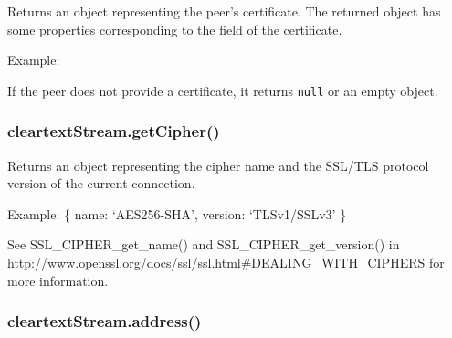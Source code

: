 Returns an object representing the peer's certificate. The returned
object has some properties corresponding to the field of the
certificate.

Example:

\begin{Shaded}
\begin{Highlighting}[]
\NormalTok{\{ }\NormalTok{: }
   \NormalTok{\{ }\NormalTok{: }\NormalTok{,}
     \NormalTok{: }\NormalTok{,}
     \NormalTok{: }\NormalTok{,}
     \NormalTok{: }\NormalTok{,}
     \NormalTok{: }\NormalTok{,}
     \NormalTok{: } \NormalTok{\},}
  \NormalTok{: }
   \NormalTok{\{ }\NormalTok{: }\NormalTok{,}
     \NormalTok{: }\NormalTok{,}
     \NormalTok{: }\NormalTok{,}
     \NormalTok{: }\NormalTok{,}
     \NormalTok{: }\NormalTok{,}
     \NormalTok{: } \NormalTok{\},}
  \NormalTok{: }\NormalTok{,}
  \NormalTok{: }\NormalTok{,}
  \NormalTok{: } \NormalTok{\}}
\end{Highlighting}
\end{Shaded}

If the peer does not provide a certificate, it returns \texttt{null} or
an empty object.

\subsubsection{cleartextStream.getCipher()}

Returns an object representing the cipher name and the SSL/TLS protocol
version of the current connection.

Example: \{ name: `AES256-SHA', version: `TLSv1/SSLv3' \}

See SSL\_CIPHER\_get\_name() and SSL\_CIPHER\_get\_version() in
http://www.openssl.org/docs/ssl/ssl.html\#DEALING\_WITH\_CIPHERS for
more information.

\subsubsection{cleartextStream.address()}

